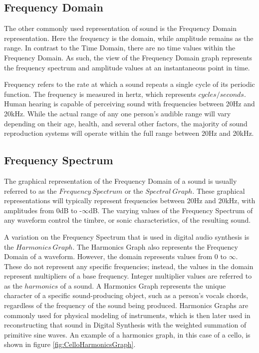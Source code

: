 \documentclass[a4paper,12pt]{report}
\begin{document}
\subsection{Frequency Domain}
\label{subsec:freqdomain}
The other commonly used representation of sound is the Frequency Domain representation. Here the frequency is the domain, while amplitude remains as the range. In contrast to the Time Domain, there are no time values within the Frequency Domain. As such, the view of the Frequency Domain graph represents the frequency spectrum and amplitude values at an instantaneous point in time.

Frequency refers to the rate at which a sound repeats a single cycle of its periodic function. The frequency is measured in hertz, which represents $cycles/seconds$. Human hearing is capable of perceiving sound with frequencies between 20Hz and 20kHz. While the actual range of any one person's audible range will vary depending on their age, health, and several other factors, the majority of sound reproduction systems will operate within the full range between 20Hz and 20kHz. 

\subsection{Frequency Spectrum}
\label{subsec:freqspect}
The graphical representation of the Frequency Domain of a sound is usually referred to as the $Frequency\ Spectrum$ or the $Spectral\ Graph$. These graphical representations will typically represent frequencies between 20Hz and 20kHz, with amplitudes from 0dB to -$\infty$dB. The varying values of the Frequency Spectrum of any waveform control the timbre, or sonic characteristics, of the resulting sound.

A variation on the Frequency Spectrum that is used in digital audio synthesis is the $Harmonics\ Graph$. The Harmonics Graph also represents the Frequency Domain of a waveform. However, the domain represents values from 0 to $\infty$. These do not represent any specific frequencies; instead, the values in the domain represent multipliers of a base frequency. Integer multiplier values are referred to as the $harmonics$ of a sound. A Harmonics Graph represents the unique character of a specific sound-producing object, such as a person's vocals chords, regardless of the frequency of the sound being produced. Harmonics Graphs are commonly used for physical modeling of instruments, which is then later used in reconstructing that sound in Digital Synthesis with the weighted summation of primitive sine waves. An example of a harmonics graph, in this case of a cello, is shown in figure \ref{fig:CelloHarmonicsGraph}.
\end{document}

